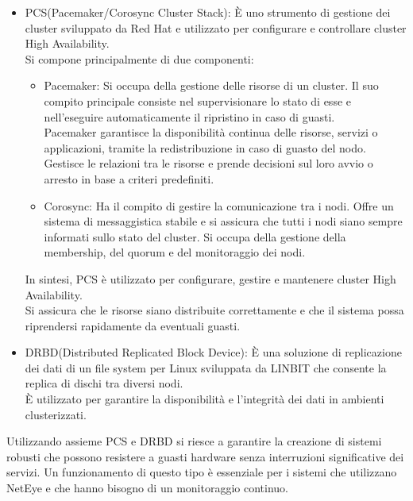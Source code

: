 \begin{itemize}
  \item PCS(Pacemaker/Corosync Cluster Stack): È uno strumento di gestione dei cluster
    sviluppato da Red Hat e utilizzato per configurare e controllare cluster High
    Availability.\\ Si compone principalmente di due componenti:
    \begin{itemize}
      \item Pacemaker: Si occupa della gestione delle risorse di un cluster. Il suo
        compito principale consiste nel supervisionare lo stato di esse e nell'eseguire
        automaticamente il ripristino in caso di guasti.\\ Pacemaker garantisce la
        disponibilità continua delle risorse, servizi o applicazioni, tramite la
        redistribuzione in caso di guasto del nodo. Gestisce le relazioni tra le
        risorse e prende decisioni sul loro avvio o arresto in base a criteri
        predefiniti.

      \item Corosync: Ha il compito di gestire la comunicazione tra i nodi. Offre
        un sistema di messaggistica stabile e si assicura che tutti i nodi siano
        sempre informati sullo stato del cluster. Si occupa della gestione della
        membership, del quorum e del monitoraggio dei nodi.
    \end{itemize}
    In sintesi, PCS è utilizzato per configurare, gestire e mantenere cluster
    High Availability.\\ Si assicura che le risorse siano distribuite
    correttamente e che il sistema possa riprendersi rapidamente da eventuali
    guasti.

  \item DRBD(Distributed Replicated Block Device): È una soluzione di replicazione
    dei dati di un file system per Linux sviluppata da LINBIT che consente la replica
    di dischi tra diversi nodi.\\ È utilizzato per garantire la disponibilità e l'integrità
    dei dati in ambienti clusterizzati.
\end{itemize}
Utilizzando assieme PCS e DRBD si riesce a garantire la creazione di sistemi robusti
che possono resistere a guasti hardware senza interruzioni significative dei servizi.
Un funzionamento di questo tipo è essenziale per i sistemi che utilizzano NetEye
e che hanno bisogno di un monitoraggio continuo.